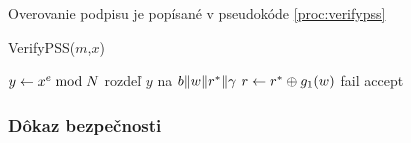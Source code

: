 Overovanie podpisu je popísané v pseudokóde \ref{proc:verifypss}

\begin{procedure}
    \caption{VerifyPSS($m$,$x$)}
    \label{proc:verifypss}
    $y \leftarrow x^e \bmod N$\;
    rozdeľ $y$ na $b \| w \| r^* \| \gamma$\;
    $r \leftarrow r^* \oplus g_1(w)$\;
    {%
        \Return fail\;
    }{%
        \Return accept\;
    }
\end{procedure}


\subsubsection{Dôkaz bezpečnosti}
